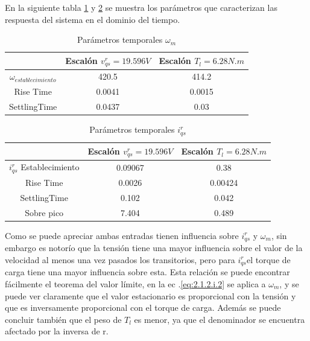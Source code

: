 \documentclass[10pt]{article}
\begin{document}
\begin{itemize}
	En la siguiente tabla \ref{tab:1} y \ref{tab:2} se muestra los parámetros que caracterizan las respuesta del sistema en el dominio del tiempo.
	\begin{table}[!h]
	\begin{center}
	\begin{tabular}{| c | c | c | }
	\hline
	  & Escalón $v^{r}_{qs}=19.596 V$& Escalón $T_{l}=6.28 N.m$\\ \hline
	 $\omega_{establecimiento}$ &  420.5 &  414.2 \\ \hline
	 Rise Time &  0.0041 &  0.0015\\ \hline
	SettlingTime& 0.0437 & 0.03 \\ \hline
	\end{tabular}
	\caption{Parámetros temporales $\omega_{m}$}
	\label{tab:1}
	\end{center}
	\end{table}
	
	\begin{table}[!h]
	\begin{center}
	\begin{tabular}{| c | c | c | }
	\hline
	  & Escalón $v^{r}_{qs}=19.596 V$& Escalón $T_{l}=6.28 N.m$\\ \hline
	 $ i^{r}_{qs}$ Establecimiento &   0.09067 &  0.38 \\ \hline
	 Rise Time &  0.0026 &  0.00424\\ \hline
	SettlingTime& 0.102 & 0.042 \\ \hline
	Sobre pico & 7.404 & 0.489 \\ \hline
	\end{tabular}
	\caption{Parámetros temporales $i^{r}_{qs}$}
	\label{tab:2}
	\end{center}
	\end{table}
	
	Como se puede apreciar ambas entradas tienen influencia sobre $ i^{r}_{qs}$ y $\omega_{m}$, sin embargo es notorío que la tensión tiene una mayor influencia sobre el valor de la velocidad al menos una vez pasados los transitorios, pero para $ i^{r}_{qs}$el torque de carga tiene una mayor influencia sobre esta. Esta relación se puede encontrar fácilmente el teorema del valor límite, en la ec .\ref{eq:2.1.2.i.2} se aplica a $\omega_{m}$, y se puede ver claramente que el valor estacionario es proporcional con la tensión y que es inversamente proporcional con el torque de carga. Además se puede concluir también que el peso de $T_{l}$ es menor, ya que el denominador se encuentra afectado por la inversa de r.
	

\end{itemize}
\end{document}
